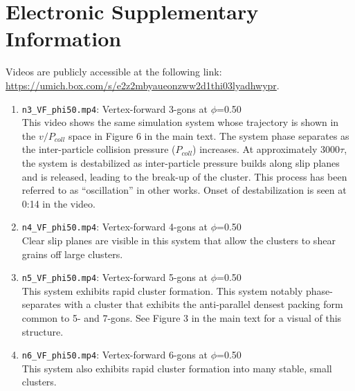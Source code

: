 \section{Electronic Supplementary Information}

Videos are publicly accessible at the following link: \\
\href{https://umich.box.com/s/e2z2mbyaueonzww2d1thi03lyadhwypr}{https://umich.box.com/s/e2z2mbyaueonzww2d1thi03lyadhwypr}.

\begin{enumerate}
  \item \verb|n3_VF_phi50.mp4|: Vertex-forward 3-gons at $\phi$=0.50 \\
  This video shows the same simulation system whose trajectory is shown in the $v/P_{coll}$ space in Figure 6 in the main text. The system phase separates as the inter-particle collision pressure ($P_{coll}$) increases. At approximately 3000$\tau$, the system is destabilized as inter-particle pressure builds along slip planes and is released, leading to the break-up of the cluster. This process has been referred to as “oscillation” in other works. Onset of destabilization is seen at 0:14 in the video.
  \item \verb|n4_VF_phi50.mp4|: Vertex-forward 4-gons at $\phi$=0.50 \\
  Clear slip planes are visible in this system that allow the clusters to shear grains off large clusters.
  \item \verb|n5_VF_phi50.mp4|: Vertex-forward 5-gons at $\phi$=0.50 \\
  This system exhibits rapid cluster formation. This system notably phase-separates with a cluster that exhibits the anti-parallel densest packing form common to 5- and 7-gons. See Figure 3 in the main text for a visual of this structure.
  \item \verb|n6_VF_phi50.mp4|: Vertex-forward 6-gons at $\phi$=0.50 \\
  This system also exhibits rapid cluster formation into many stable, small clusters.
\end{enumerate}
